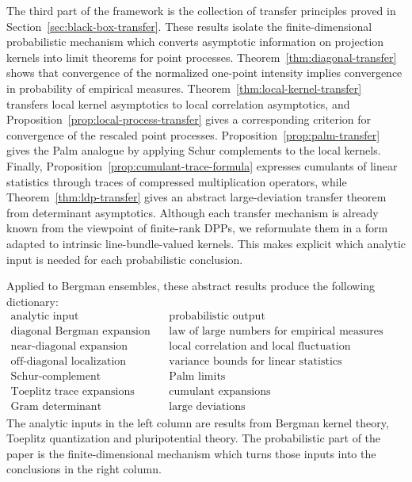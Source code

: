 \documentclass[12pt,a4paper,reqno]{article}
\theoremstyle{thmstyleone}
\theoremstyle{thmstylethree}
\theoremstyle{thmstyletwo}
\numberwithin{equation}{subsection}
\begin{document}
The third part of the framework is the collection of transfer principles proved in Section~\ref{sec:black-box-transfer}.  These results isolate the finite-dimensional probabilistic mechanism which converts asymptotic information on projection kernels into limit theorems for point processes. Theorem~\ref{thm:diagonal-transfer} shows that convergence of the normalized one-point intensity implies convergence in probability of empirical measures.  Theorem~\ref{thm:local-kernel-transfer} transfers local kernel asymptotics to local correlation asymptotics, and Proposition~\ref{prop:local-process-transfer} gives a corresponding criterion for convergence of the rescaled point processes. Proposition~\ref{prop:palm-transfer} gives the Palm analogue by applying Schur complements to the local kernels.  Finally, Proposition~\ref{prop:cumulant-trace-formula} expresses cumulants of linear statistics through traces of compressed multiplication operators, while Theorem~\ref{thm:ldp-transfer} gives an abstract large-deviation transfer theorem from determinant asymptotics. Although each transfer mechanism is already known from the viewpoint of finite-rank DPPs, we reformulate them in a form adapted to intrinsic line-bundle-valued kernels. This makes explicit which analytic input is needed for each probabilistic conclusion.

Applied to Bergman ensembles, these abstract results produce the following dictionary:
\[
\begin{array}{c|c}
\text{analytic input} & \text{probabilistic output} \\
\hline
\text{diagonal Bergman expansion} & \text{law of large numbers for empirical measures} \\
\text{near-diagonal expansion} & \text{local correlation and local fluctuation expansions} \\
\text{off-diagonal localization} & \text{variance bounds for linear statistics} \\
\text{Schur-complement asymptotics} & \text{Palm limits} \\
\text{Toeplitz trace expansions} & \text{cumulant expansions} \\
\text{Gram determinant asymptotics} & \text{large deviations}
\end{array}
\]
The analytic inputs in the left column are results from Bergman kernel theory, Toeplitz quantization and pluripotential theory.  The probabilistic part of the paper is the finite-dimensional mechanism which turns those inputs into the conclusions in the right column.
\end{document}
